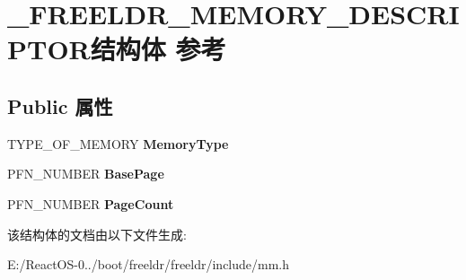\hypertarget{struct___f_r_e_e_l_d_r___m_e_m_o_r_y___d_e_s_c_r_i_p_t_o_r}{}\section{\+\_\+\+F\+R\+E\+E\+L\+D\+R\+\_\+\+M\+E\+M\+O\+R\+Y\+\_\+\+D\+E\+S\+C\+R\+I\+P\+T\+O\+R结构体 参考}
\label{struct___f_r_e_e_l_d_r___m_e_m_o_r_y___d_e_s_c_r_i_p_t_o_r}
\subsection*{Public 属性}
\begin{DoxyCompactItemize}
\item 
\mbox{\label{struct___f_r_e_e_l_d_r___m_e_m_o_r_y___d_e_s_c_r_i_p_t_o_r_a0fb327bc039eca546573aa8653dafc1e}} 
T\+Y\+P\+E\+\_\+\+O\+F\+\_\+\+M\+E\+M\+O\+RY {\bfseries Memory\+Type}
\item 
\mbox{\label{struct___f_r_e_e_l_d_r___m_e_m_o_r_y___d_e_s_c_r_i_p_t_o_r_a82dd1db65089e8ad30ed7a085f1e6320}} 
P\+F\+N\+\_\+\+N\+U\+M\+B\+ER {\bfseries Base\+Page}
\item 
\mbox{\label{struct___f_r_e_e_l_d_r___m_e_m_o_r_y___d_e_s_c_r_i_p_t_o_r_a57b2615098e3303d82d531911a2a1293}} 
P\+F\+N\+\_\+\+N\+U\+M\+B\+ER {\bfseries Page\+Count}
\end{DoxyCompactItemize}


该结构体的文档由以下文件生成\+:\begin{DoxyCompactItemize}
\item 
E\+:/\+React\+O\+S-\/0../boot/freeldr/freeldr/include/mm.\+h\end{DoxyCompactItemize}
